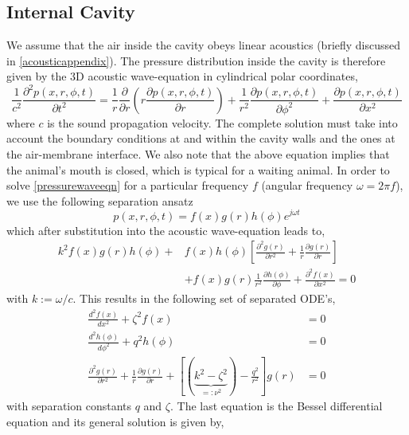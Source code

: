 \subsection{Internal Cavity}
We assume that the air inside the cavity obeys linear acoustics (briefly discussed in \ref{acousticappendix}). The pressure distribution inside the cavity
is therefore given by the $3$D acoustic wave-equation in cylindrical polar coordinates,	
\begin{equation}\label{pressurewaveeqn}
 \frac{1}{c^2}\frac{\partial^2 p(x,r,\phi,t)}{\partial t^2}=\frac{1}{r}\frac{\partial}{\partial r}\left(r\frac{\partial p(x,r,\phi,t)}{\partial r}\right)
 +\frac{1}{r^2}\frac{\partial p(x,r,\phi,t)}{\partial \phi^2}+\frac{\partial p(x,r,\phi,t)}{\partial x^2}
\end{equation}
where $c$ is the sound propagation velocity. The complete solution must take into account the boundary conditions at and within the cavity walls and the
ones at the air-membrane interface. We also note that the above equation implies that the animal's mouth is closed, which is typical for a waiting
animal. In order to solve \eqref{pressurewaveeqn} for a particular frequency $f$ (angular frequency $\omega=2\pi f$), we use the following
separation ansatz
\begin{equation}\label{pseparationansatz}
  p(x,r,\phi,t)=f(x)g(r)h(\phi)e^{j\omega t}
\end{equation}
which after substitution into the acoustic wave-equation leads to,
\begin{equation}\label{pseparationansatz2}
\begin{split}
 k^2f(x)g(r)h(\phi)+&f(x)h(\phi)\left[\frac{\partial^2 g(r)}{\partial r^2} + \frac{1}{r}\frac{\partial g(r)}{\partial r}\right] \\
 &+f(x)g(r)\frac{1}{r^2}\frac{\partial h(\phi)}{\partial \phi}+\frac{\partial^2 f(x)}{\partial x^2}=0
\end{split}
\end{equation}
with $k:=\omega/c$. This results in the following set of separated ODE's,
\begin{align}
 \frac{d^2 f(x)}{dx^2}+\zeta^2f(x)&=0\\
 \frac{d^2 h(\phi)}{d\phi^2}+q^2h(\phi	)&=0\\
 \frac{\partial^2 g(r)}{\partial r^2} + \frac{1}{r}\frac{\partial g(r)}{\partial r}+\left[(\displaystyle\underbrace{k^2-\zeta^2}_{=:\nu^2})-\frac{q^2}{r^2}\right]g(r)&=0\label{besselequation1}
\end{align}
with separation constants $q$ and $\zeta$. The last equation is the Bessel differential equation \cite[p.~313]{copsonbessel} and its general solution is given by,
